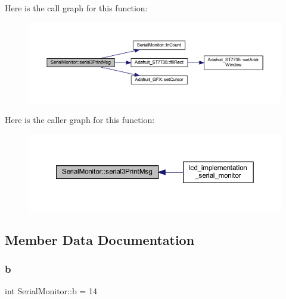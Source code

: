 Here is the call graph for this function\+:
\nopagebreak
\begin{figure}[H]
\begin{center}
\leavevmode
\includegraphics[width=350pt]{d3/dd4/class_serial_monitor_a2e2164f6a67a339e28e0fe566954fa06_cgraph}
\end{center}
\end{figure}
Here is the caller graph for this function\+:
\nopagebreak
\begin{figure}[H]
\begin{center}
\leavevmode
\includegraphics[width=350pt]{d3/dd4/class_serial_monitor_a2e2164f6a67a339e28e0fe566954fa06_icgraph}
\end{center}
\end{figure}


\subsection{Member Data Documentation}
\mbox{\label{class_serial_monitor_a2f19a1abd632968b33a1ef708eda89d6}} 
\subsubsection{\texorpdfstring{b}{b}}
{\footnotesize\ttfamily int Serial\+Monitor\+::b = 14}

\mbox{\label{class_serial_monitor_ae4e18850fa4b68adcba828613ac53cc7}} 
